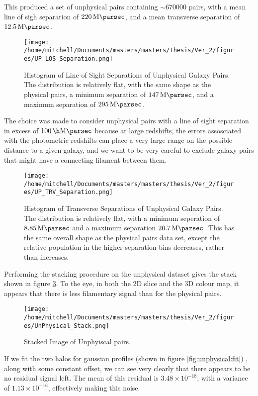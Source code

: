 This produced a set of unphysical pairs containing $\sim 670000$ pairs, with a mean line of sigh separation of $\SI{220}{\mega\parsec}$, and a mean transverse separation of $\SI{12.5}{\mega\parsec}$.


\begin{figure}[h!]
\centering
\texttt{[image: /home/mitchell/Documents/masters/masters/thesis/Ver\_2/figures/UP\_LOS\_Separation.png]}
\caption{Histogram of Line of Sight Separations of Unphysical Galaxy Pairs. The distribution is relatively flat, with the same shape as the physical pairs, a minimum separation of $\SI{147}{\mega\parsec}$, and a maximum separation of $\SI{295}{\mega\parsec}$.  }
\label{fig:unphysical:lineofsight}
\end{figure}

The choice was made to consider unphysical pairs with a line of sight separation in excess of $\SI{100}{\per\h\mega\parsec}$ because at large redshifts, the errors assosciated with the photometric redshifts can place a very large range on the possible distance to a given galaxy, and we want to be very careful to exclude galaxy pairs that might have a connecting filament between them. 

\begin{figure}[h!]
\centering
\texttt{[image: /home/mitchell/Documents/masters/masters/thesis/Ver\_2/figures/UP\_TRV\_Separation.png]}
\caption{Histogram of Transverse Separations of Unphysical Galaxy Pairs. The distribution is relatively flat, with a minimum seperation of $\SI{8.85}{\mega\parsec}$ and a maximum separation $\SI{20.7}{\mega\parsec}$. This has the same overall shape as the physical pairs data set, except the relative population in the higher separation bins decreases, rather than increases.}
\label{fig:unphysical:transverse}
\end{figure}

Performing the stacking procedure on the unphysical dataset gives the stack shown in figure \ref{fig:unphysical:stack}. To the eye, in both the 2D slice and the 3D colour map, it appears that there is less filamentary signal than for the physical pairs. 

\begin{figure}[h!]
\centering
\texttt{[image: /home/mitchell/Documents/masters/masters/thesis/Ver\_2/figures/UnPhysical\_Stack.png]}
\caption{Stacked Image of Unphyiscal pairs.}
\label{fig:unphysical:stack}
\end{figure}

If we fit the two halos for gaussian profiles (shown in figure \ref{fig:unphysical:fit}) , along with some constant offset, we can see very clearly that there appears to be no residual signal left. The mean of this residual is $3.48 \times 10^{-18}$, with a variance of $1.13 \times 10^{-16}$, effectively making this noise. 


